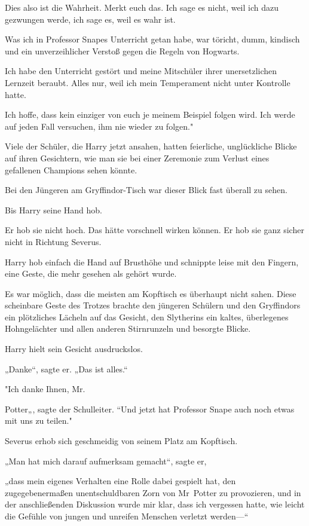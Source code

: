 {Dies also ist die Wahrheit. Merkt euch das. Ich sage es nicht, weil ich dazu gezwungen werde, ich sage es, weil es wahr ist.

Was ich in Professor Snapes Unterricht getan habe, war töricht, dumm, kindisch und ein unverzeihlicher Verstoß gegen die Regeln von Hogwarts.

Ich habe den Unterricht gestört und meine Mitschüler ihrer unersetzlichen Lernzeit beraubt. Alles nur, weil ich mein Temperament nicht unter Kontrolle hatte.

Ich hoffe, dass kein einziger von euch je meinem Beispiel folgen wird. Ich werde auf jeden Fall versuchen, ihm nie wieder zu folgen."

Viele der Schüler, die Harry jetzt ansahen, hatten feierliche, unglückliche Blicke auf ihren Gesichtern, wie man sie bei einer Zeremonie zum Verlust eines gefallenen Champions sehen könnte.

Bei den Jüngeren am Gryffindor-Tisch war dieser Blick fast überall zu sehen.

Bis Harry seine Hand hob.

Er hob sie nicht hoch. Das hätte vorschnell wirken können. Er hob sie ganz sicher nicht in Richtung Severus.

Harry hob einfach die Hand auf Brusthöhe und schnippte leise mit den Fingern, eine Geste, die mehr gesehen als gehört wurde.

Es war möglich, dass die meisten am Kopftisch es überhaupt nicht sahen. Diese scheinbare Geste des Trotzes brachte den jüngeren Schülern und den Gryffindors ein plötzliches Lächeln auf das Gesicht, den Slytherins ein kaltes, überlegenes Hohngelächter und allen anderen Stirnrunzeln und besorgte Blicke.

Harry hielt sein Gesicht ausdruckslos.

„Danke“, sagte er. „Das ist alles.“

"Ich danke Ihnen, Mr.

Potter„, sagte der Schulleiter. “Und jetzt hat Professor Snape auch noch etwas mit uns zu teilen."

Severus erhob sich geschmeidig von seinem Platz am Kopftisch.

„Man hat mich darauf aufmerksam gemacht“, sagte er,

„dass mein eigenes Verhalten eine Rolle dabei gespielt hat, den zugegebenermaßen unentschuldbaren Zorn von Mr~Potter zu provozieren, und in der anschließenden Diskussion wurde mir klar, dass ich vergessen hatte, wie leicht die Gefühle von jungen und unreifen Menschen verletzt werden—“

}
